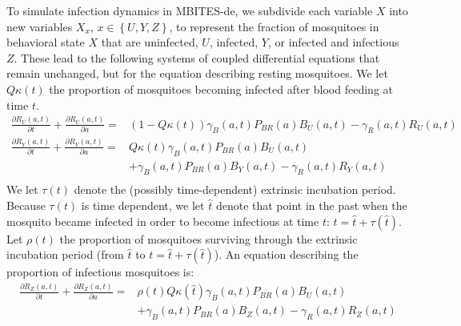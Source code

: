 \documentclass{article}
\begin{document}
To simulate infection dynamics in MBITES-de, we subdivide each variable $X$ into new variables $X_x$, $x \in \left\{ U, Y, Z \right\}$, to represent the fraction of mosquitoes in behavioral state $X$ that are uninfected, $U$, infected, $Y$, or infected and infectious $Z$.  These lead to the following systems of coupled differential equations that remain unchanged, but for the equation describing resting mosquitoes. We let  $Q\kappa(t)$ the proportion of mosquitoes becoming infected after blood feeding at time $t$. 
%
\begin{equation}\begin{array}{rl}
%
\frac{\partial R_U(a,t)}{\partial t} + \frac{\partial
R_U(a,t)}{\partial a} =& \left(1-Q \kappa(t) \right) \gamma_B(a,t) P_{BR}(a) B_U(a,t)
- \gamma_R(a,t) R_U(a,t)\\

\frac{\partial R_Y(a,t)}{\partial t} + \frac{\partial
R_Y(a,t)}{\partial a} =&  Q \kappa(t) \gamma_B(a,t) P_{BR}(a) B_U(a,t)\\&
+ \gamma_B(a,t) P_{BR}(a) B_Y(a,t) 
- \gamma_R(a,t) R_Y(a,t)\\
\end{array}\end{equation}
%
We let $\tau(t)$ denote the (possibly time-dependent) extrinsic incubation period. Because $\tau(t)$ is time dependent, we let $\hat t$ denote that point in the past when the mosquito became infected in order to become infectious at time $t$: \ie $t = \hat t + \tau(\hat t)$. Let $\rho(t)$ the proportion of mosquitoes surviving through the extrinsic incubation period (\ie from $\hat t$ to $t = \hat t +\tau (\hat t)$). An equation describing the proportion of infectious mosquitoes is:
%
\begin{equation}\begin{array}{rl}
\frac{\partial R_Z(a,t)}{\partial t} + \frac{\partial
R_Z(a,t)}{\partial a} =&  \rho(t) Q \kappa \left( \hat t \right) \gamma_B(a,t) P_{BR}(a) B_U(a,t) \\&
+ \gamma_B(a,t) P_{BR}(a) B_Z(a,t)
- \gamma_R(a,t) R_Z(a,t)\\
%
\end{array}\end{equation}
\end{document}
